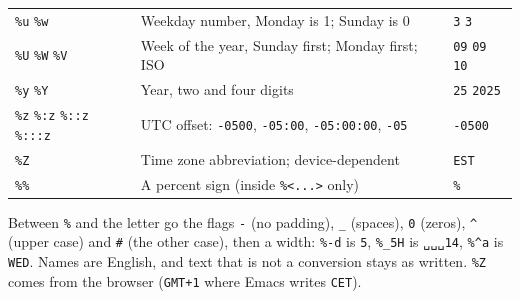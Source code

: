 \documentclass[11pt]{article}
\begin{document}
\begin{center}
\begin{tabular}{lll}
\texttt{\%u} \texttt{\%w} & Weekday number, Monday is 1; Sunday is 0 & \texttt{3} \texttt{3}\\[0pt]
\texttt{\%U} \texttt{\%W} \texttt{\%V} & Week of the year, Sunday first; Monday first; ISO & \texttt{09} \texttt{09} \texttt{10}\\[0pt]
\texttt{\%y} \texttt{\%Y} & Year, two and four digits & \texttt{25} \texttt{2025}\\[0pt]
\texttt{\%z} \texttt{\%:z} \texttt{\%::z} \texttt{\%:::z} & UTC offset: \texttt{-0500}, \texttt{-05:00}, \texttt{-05:00:00}, \texttt{-05} & \texttt{-0500}\\[0pt]
\texttt{\%Z} & Time zone abbreviation; device-dependent & \texttt{EST}\\[0pt]
\texttt{\%\%} & A percent sign (inside \texttt{\%<...>} only) & \texttt{\%}\\[0pt]
\end{tabular}
\end{center}

Between \texttt{\%} and the letter go the flags \texttt{-} (no padding), \texttt{\_} (spaces), \texttt{0} (zeros), \texttt{\textasciicircum{}} (upper case) and \texttt{\#} (the other case), then a width: \texttt{\%-d} is \texttt{5}, \texttt{\%\_5H} is \texttt{␣␣␣14}, \texttt{\%\textasciicircum{}a} is \texttt{WED}. Names are English, and text that is not a conversion stays as written. \texttt{\%Z} comes from the browser (\texttt{GMT+1} where Emacs writes \texttt{CET}).
\end{document}
